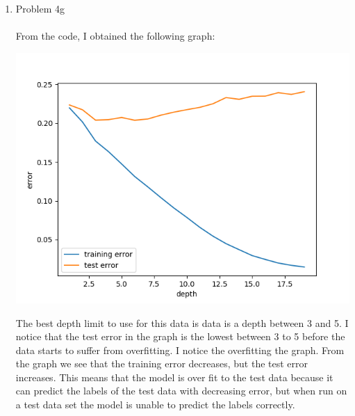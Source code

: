 \documentclass[11pt]{article}
\newcommand{\solution}[1]{{{\color{blue}{\bf Solution:} {#1}}}}
\begin{document}
\begin{enumerate}
\item Problem 4g \\
\solution{} \\
From the code, I obtained the following graph: \\
\centerline{\includegraphics[scale=0.5]{Figure_2}}
The best depth limit to use for this data is data is a depth between 3 and 5. I notice that the test error in the graph is the lowest between 3 to 5 before the data starts to suffer from overfitting. I notice the overfitting the graph. From the graph we see that the training error decreases, but the test error increases. This means that the model is over fit to the test data because it can predict the labels of the test data with decreasing error, but when run on a test data set the model is unable to predict the labels correctly. 


\end{enumerate}
\end{document}

